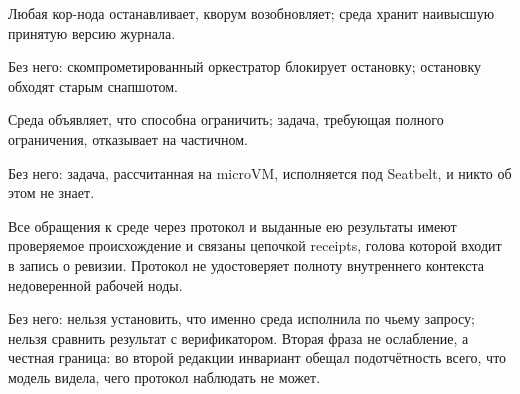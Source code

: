 \begin{invbox}
Любая кор-нода останавливает, кворум возобновляет; среда хранит наивысшую принятую версию журнала.

Без него: скомпрометированный оркестратор блокирует остановку; остановку обходят старым снапшотом.
\end{invbox}

\begin{invbox}
Среда объявляет, что способна ограничить; задача, требующая полного ограничения, отказывает на частичном.

Без него: задача, рассчитанная на microVM, исполняется под Seatbelt, и никто об этом не знает.
\end{invbox}

\begin{invbox}
Все обращения к среде через протокол и выданные ею результаты имеют проверяемое происхождение и связаны цепочкой receipts, голова которой входит в запись о ревизии. Протокол не удостоверяет полноту внутреннего контекста недоверенной рабочей ноды.

Без него: нельзя установить, что именно среда исполнила по чьему запросу; нельзя сравнить результат с верификатором. Вторая фраза не ослабление, а честная граница: во второй редакции инвариант обещал подотчётность всего, что модель видела, чего протокол наблюдать не может.
\end{invbox}
